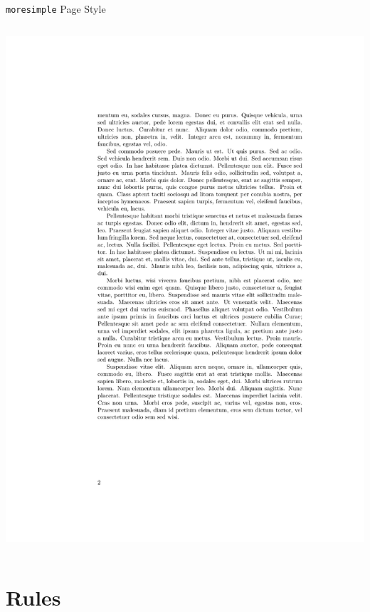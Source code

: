 \documentclass{beamer}
\begin{document}
\begin{frame}[fragile]{\texttt{moresimple} Page Style}
\begin{columns}
\begin{column}{0.4\textwidth}
\begin{overprint}
        \includegraphics[frame,width=\linewidth]{moresimple-hf-2}
      \end{overprint}
    \end{column}
  \end{columns}
\end{frame}


\section{Rules}
\end{document}
